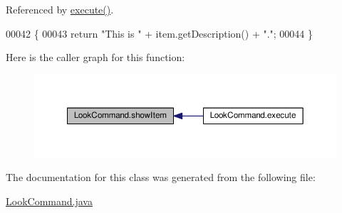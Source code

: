 Referenced by \hyperlink{LookCommand_8java_source_l00020}{execute()}.


\begin{DoxyCode}
00042                                        \{
00043         \textcolor{keywordflow}{return} \textcolor{stringliteral}{"This is "} + item.getDescription() + \textcolor{stringliteral}{"."};
00044     \}
\end{DoxyCode}


Here is the caller graph for this function\-:
\nopagebreak
\begin{figure}[H]
\begin{center}
\leavevmode
\includegraphics[width=350pt]{classLookCommand_ad96c354dee73acf189f99e988a796bc7_icgraph}
\end{center}
\end{figure}




The documentation for this class was generated from the following file\-:\begin{DoxyCompactItemize}
\item 
\hyperlink{LookCommand_8java}{Look\-Command.\-java}\end{DoxyCompactItemize}
